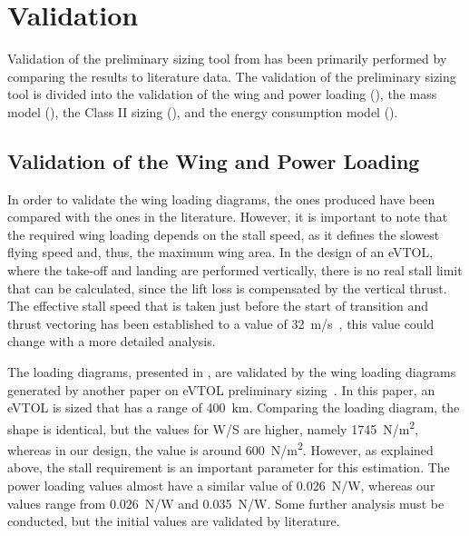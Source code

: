 \section{Validation}\label{sec:Validation}
Validation of the preliminary sizing tool from  has been primarily performed by comparing the results to literature data.
The validation of the preliminary sizing tool is divided into the validation of the wing and power loading (), the mass model (), the Class II sizing (), and the energy consumption model ().

\subsection{Validation of the Wing and Power Loading}\label{subsec:ValidationWingPowerLoading}
In order to validate the wing loading diagrams, the ones produced have been compared with the ones in the literature.
However, it is important to note that the required wing loading depends on the stall speed, as it defines the slowest flying speed and, thus, the maximum wing area.
In the design of an eVTOL, where the take-off and landing are performed vertically, there is no real stall limit that can be calculated, since the lift loss is compensated by the vertical thrust.
The effective stall speed that is taken just before the start of transition and thrust vectoring has been established to a value of \qty{32}{m/s}~\cite{easa_cs23_2020}, this value could change with a more detailed analysis.

The loading diagrams, presented in , are validated by the wing loading diagrams generated by another paper on eVTOL preliminary sizing~\cite{SaullloCastro}.
In this paper, an eVTOL is sized that has a range of \qty{400}{km}.
Comparing the loading diagram, the shape is identical, but the values for W/S are higher, namely \qty{1745}{N/m^2}, whereas in our design, the value is around \qty{600}{N/m^2}.
However, as explained above, the stall requirement is an important parameter for this estimation.
The power loading values almost have a similar value of \qty{0.026}{N/W}, whereas our values range from \qty{0.026}{N/W} and \qty{0.035}{N/W}.
Some further analysis must be conducted, but the initial values are validated by literature.




